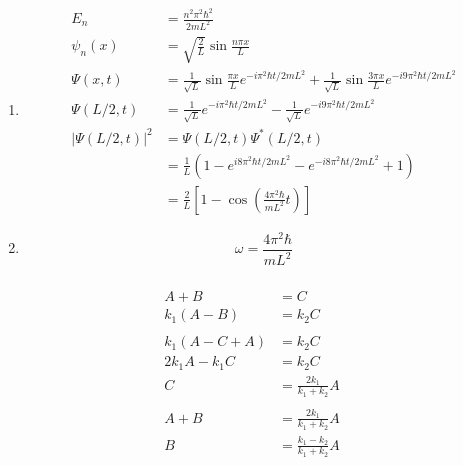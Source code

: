 \documentclass{article}
\begin{document}
\setcounter{subsubsection}{42}
\subsubsection{}

\begin{enumerate}
  \item

        \begin{align*}
          E_n                & = \frac{n^2 \pi^2 \hbar^2}{2 m L^2}                                                                                                                   \\
          \psi_n(x)          & = \sqrt{\frac{2}{L}} \sin \frac{n \pi x}{L}                                                                                                           \\
          \Psi(x, t)         & = \frac{1}{\sqrt{L}} \sin \frac{\pi x}{L} e^{-i \pi^2 \hbar t / 2 m L^2} + \frac{1}{\sqrt{L}} \sin \frac{3 \pi x}{L} e^{-i 9 \pi^2 \hbar t / 2 m L^2} \\
          \Psi(L / 2, t)     & = \frac{1}{\sqrt{L}} e^{-i \pi^2 \hbar t / 2 m L^2} - \frac{1}{\sqrt{L}} e^{-i 9 \pi^2 \hbar t / 2 m L^2}                                             \\
          |\Psi(L / 2, t)|^2 & = \Psi(L / 2, t) \Psi^*(L / 2, t)                                                                                                                     \\
                             & = \frac{1}{L} \left( 1 - e^{i 8 \pi^2 \hbar t / 2 m L^2} - e^{-i 8 \pi^2 \hbar t / 2 m L^2} + 1 \right)                                               \\
                             & = \frac{2}{L} \left[ 1 - \cos \left( \frac{4 \pi^2 \hbar}{m L^2} t \right) \right]
        \end{align*}

  \item \[\omega = \frac{4 \pi^2 \hbar}{m L^2}\]
\end{enumerate}

\setcounter{subsubsection}{44}
\subsubsection{}

\begin{align*}
  A + B           & = C                             \\
  k_1 (A - B)     & = k_2 C                         \\ \\
  k_1 (A - C + A) & = k_2 C                         \\
  2 k_1 A - k_1 C & = k_2 C                         \\
  C               & = \frac{2 k_1}{k_1 + k_2} A     \\ \\
  A + B           & = \frac{2 k_1}{k_1 + k_2} A     \\
  B               & = \frac{k_1 - k_2}{k_1 + k_2} A
\end{align*}
\end{document}
